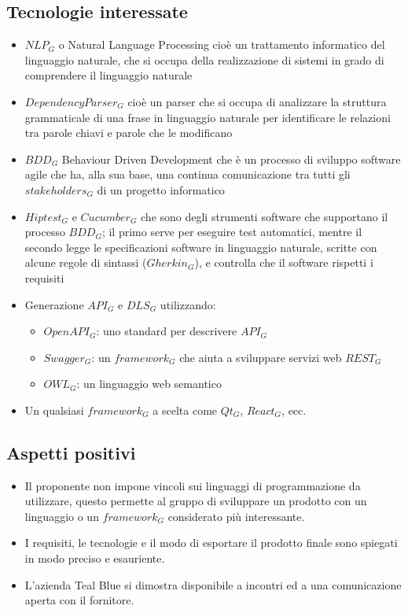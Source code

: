 \subsection{Tecnologie interessate}
\begin{itemize}
	\item $NLP_G$ o Natural Language Processing cioè un trattamento informatico del linguaggio naturale, che si occupa della realizzazione di sistemi in grado di comprendere il linguaggio naturale	
	\item $Dependency Parser_G$ cioè un parser che si occupa di analizzare la struttura grammaticale di una frase in linguaggio naturale per identificare le relazioni tra parole chiavi e parole che le modificano
	\item $BDD_G$ Behaviour Driven Development che è un processo di sviluppo software agile che ha, alla sua base, una continua comunicazione tra tutti gli $stakeholders_G$ di un progetto informatico
	\item $Hiptest_G$ e $Cucumber_G$ che sono degli strumenti software che supportano il processo $BDD_G$; il primo serve per eseguire test automatici, mentre il secondo legge le specificazioni software in linguaggio naturale, scritte con alcune regole di sintassi ($Gherkin_G$), e controlla che il software rispetti i requisiti
	\item Generazione $API_G$ e $DLS_G$ utilizzando:
	\begin{itemize}
		\item $OpenAPI_G$: uno standard per descrivere $API_G$
		\item $Swagger_G$: un $framework_G$ che aiuta a sviluppare servizi web $REST_G$
		\item $OWL_G$: un linguaggio web semantico
	\end{itemize}
	\item Un qualsiasi $framework_G$ a scelta come $Qt_G$, $React_G$, ecc.
\end{itemize} 
\subsection{Aspetti positivi}
\begin{itemize} 
	\item Il proponente non impone vincoli sui linguaggi di programmazione da utilizzare, questo permette  al gruppo di sviluppare un prodotto con un linguaggio o un $framework_G$ considerato più interessante. 
	\item I requisiti, le tecnologie e il modo di esportare il prodotto finale sono spiegati in modo preciso e esauriente.
	\item L'azienda Teal Blue si dimostra disponibile a incontri ed a una comunicazione aperta con il fornitore.
\end{itemize}
